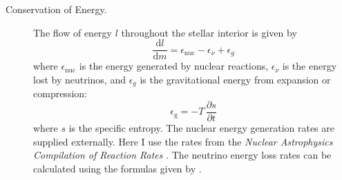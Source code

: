 \begin{description}
    \item[Conservation of Energy.]
    The flow of energy $l$ throughout the stellar interior is given by 
    \begin{equation} \label{eq:energy} \boxed{
        \frac{\text{d}l}{\text{d}m}
        =
        \epsilon_{\text{nuc}} - \epsilon_\nu + \epsilon_g %
    }\end{equation}
    where $\epsilon_{\text{nuc}}$ is the energy generated by nuclear reactions, $\epsilon_\nu$ is the energy lost by neutrinos, and $\epsilon_g$ is the gravitational energy from expansion or compression: %
    \begin{equation} \label{eq:eps-g}
        \epsilon_{\text{g}} = -T\, \frac{\partial s}{\partial t}
    \end{equation}
    where $s$ is the specific entropy. 
    The nuclear energy generation rates are supplied externally. 
    Here I use the rates from the \emph{Nuclear Astrophysics Compilation of Reaction Rates} \citep[\textsc{NACRE},][]{1999NuPhA.656....3A}. 
    The neutrino energy loss rates can be calculated using the formulas given by \citet{1996ApJS..102..411I}. 
    
    

\end{description}
